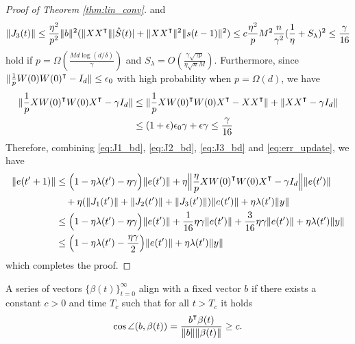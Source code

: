 \begin{proof}[Proof of Theorem \ref{thm:lin_conv}]
and
\begin{equation}
\label{eq:J3_bd}
\|J_3(t)\| \leq \frac{\eta^2}{p^2}\|b\|^2(\|XX\transpose\| |\hat{S}(t)|+\|XX\transpose\|^2 \|s(t-1)\|^2) \leq c\frac{\eta^2}{p}M^2 \frac{n}{\gamma^2}(\frac{1}{\eta}+S_\lambda)^2\leq \frac{\gamma}{16}
\end{equation}
hold if $p = \Omega(\frac{Md\log(d/\delta)}{\gamma})$ and $S_\lambda = O(\frac{\gamma\sqrt{\gamma p}}{\eta\sqrt{n}M})$. Furthermore, since $\|\frac{1}{p}W(0)W(0)\transpose-I_d\|\leq \epsilon_0$ with high probability when $p=\Omega(d)$, we have
\begin{equation}
\label{eq:xwwx_bd}
\begin{aligned}
\|\frac{1}{p}XW(0)\transpose W(0)X\transpose-\gamma I_d\| 
&\leq \|\frac{1}{p}XW(0)\transpose W(0)X\transpose-XX\transpose\| + \|XX\transpose-\gamma I_d\|  \\
&\leq (1+\epsilon)\epsilon_0\gamma+\epsilon\gamma \leq \frac{\gamma}{16}
\end{aligned}
\end{equation}
Therefore, combining \eqref{eq:J1_bd}, \eqref{eq:J2_bd}, \eqref{eq:J3_bd} and \eqref{eq:err_update}, we have
\begin{equation*}
\begin{aligned}
       \|e(t'+1)\|
       &\leq \Big(1-\eta\lambda(t')-\eta\gamma\Big) \|e(t')\| + \eta\Big\|\frac{\eta}{p}XW(0)\transpose W(0)X\transpose-\gamma I_d\Big\|\|e(t')\|\\
       &\quad + \eta(\|J_1(t')\|+\|J_2(t')\|+\|J_3(t')\|)\|e(t')\| + \eta\lambda(t')\|y\| \\ 
       &\leq \Big(1-\eta\lambda(t')-\eta\gamma\Big)\|e(t')\| + \frac{1}{16}\eta\gamma\|e(t')\|+ \frac{3}{16}\eta\gamma\|e(t')\|  + \eta\lambda(t')\|y\| \\
       &\leq\Big(1-\eta\lambda(t')-\frac{\eta\gamma}{2}\Big)\|e(t')\| +  \eta\lambda(t')\|y\| 
\end{aligned}
\end{equation*}
which completes the proof. 
\end{proof} 

\begin{definition}
    A series of vectors $\{\beta(t)\}_{t=0}^\infty$ align with a fixed vector $b$ if there exists a constant $c>0$ and time $T_c$ such that for all $t > T_c$ it holds
    \begin{align*}
        \cos\angle(b, \beta(t)) = \frac{b\transpose \beta(t)}{\|b\|\|\beta(t)\|} \geq c.
    \end{align*}
\end{definition}

